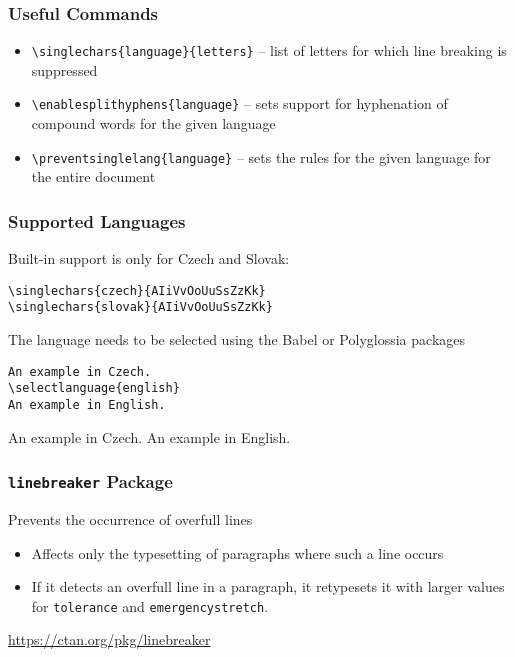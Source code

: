 \begin{frame}[fragile]
  \frametitle{Useful Commands}
  \begin{itemize}
    \item \verb|\singlechars{language}{letters}| -- list of letters for which line breaking is suppressed
    \item \verb|\enablesplithyphens{language}| -- sets support for hyphenation of compound words for the given language
    \item \verb|\preventsinglelang{language}| -- sets the rules for the given language for the entire document
  \end{itemize}
\end{frame}

\begin{frame}[fragile]
  \frametitle{Supported Languages}
  Built-in support is only for Czech and Slovak:

\begin{verbatim}
\singlechars{czech}{AIiVvOoUuSsZzKk}
\singlechars{slovak}{AIiVvOoUuSsZzKk}
\end{verbatim}

The language needs to be selected using the Babel or Polyglossia packages

\begin{verbatim}
An example in Czech.
\selectlanguage{english}
An example in English.
\end{verbatim}

    \preventsingledebugon

An example in Czech.
An example in English.

    \preventsingledebugoff


\end{frame}

\newcommand\testbox[1]{%
  \parbox{150pt}{%
    \parindent=15pt%
    \tolerance=1%
    \pretolerance=1%
    #1
  }%
}

\newcommand\printtest[1]{%
  \linebreakerdisable%
  \noindent\testbox{%
    #1
    \par\medskip\noindent\hfill\textbf{Without Linebreaker}\hfill\null
  }%
  \linebreakerenable%
  \hfill%
  \testbox{%
    #1
    \par\medskip\noindent\hfill\textbf{With Linebreaker}\hfill\null
  }%
}

\begin{frame}[fragile]
  \frametitle{\texttt{linebreaker} Package}
  Prevents the occurrence of overfull lines
  \begin{itemize}
    \item Affects only the typesetting of paragraphs where such a line occurs
    \item If it detects an overfull line in a paragraph, it retypesets it with larger values for
      \verb|tolerance| and \verb|emergencystretch|.
  \end{itemize}
  \url{https://ctan.org/pkg/linebreaker}
\end{frame}

